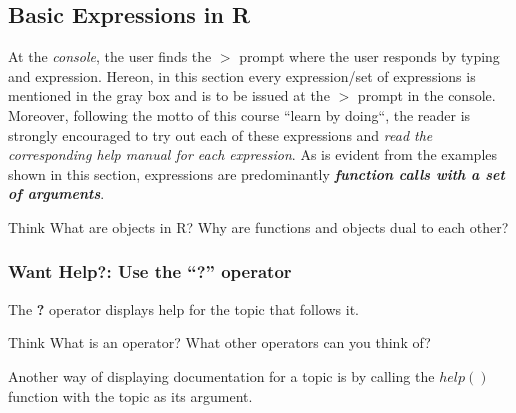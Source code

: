 \subsection{Basic Expressions in R}
At the \emph{console}, the user finds the \textbf{$>$} prompt where the user responds by typing and expression. Hereon, in this section every expression/set of expressions is mentioned in the gray box and is to be issued at the $>$ prompt in the console. Moreover, following the motto of this course ``learn by doing``, the reader is strongly encouraged to try out each of these expressions and \emph{read the corresponding help manual for each expression}. As is evident from the examples shown in this section, expressions are predominantly \textbf{\emph{function calls with a set of arguments}}.

\begin{HIGHLIGHT}
\par{}
\end{HIGHLIGHT}

\begin{DIY}{Think}
What are objects in R? Why are functions and objects dual to each other? 
\end{DIY}

\subsubsection{Want Help?: Use the ``\textbf{?}'' operator}
\noindent The \textbf{?} operator displays help for the topic that follows it.
\begin{knitrout}
\color{fgcolor}\begin{kframe}
\begin{alltt}
\end{alltt}
\end{kframe}
\end{knitrout}

\begin{DIY}{Think}
What is an operator? What other operators can you think of? 
\end{DIY}

\noindent Another way of displaying documentation for a topic is by calling the $help()$ function with the topic as its argument. 
\begin{knitrout}
\color{fgcolor}\begin{kframe}
\begin{alltt}
\hlstd{(}\hlstd{)}
\end{alltt}
\end{kframe}
\end{knitrout}

